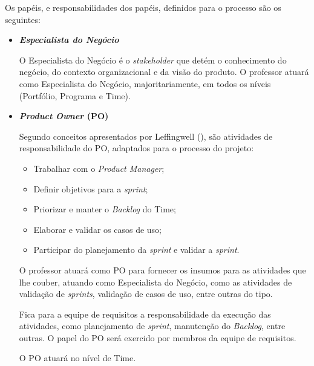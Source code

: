 
  Os papéis, e responsabilidades dos papéis, definidos para o processo são os seguintes:
  
  \begin{itemize}
   
   \item \textbf{\textit{Especialista do Negócio}}
   
      O Especialista do Negócio é o \textit{stakeholder} que detém o conhecimento do negócio, do contexto organizacional
      e da visão do produto.
      O professor atuará como Especialista do Negócio, majoritariamente, em todos os níveis (Portfólio, Programa e Time).
   
   \item \textbf{\textit{Product Owner} (PO)}
      
      Segundo conceitos apresentados por Leffingwell (\citeyear{leffingwell11}),
      são atividades de responsabilidade do PO, adaptados para o processo do projeto:
      
      \begin{itemize}
       
       \item Trabalhar com o \textit{Product Manager};
       
       \item Definir objetivos para a \textit{sprint};
       
       \item Priorizar e manter o \textit{Backlog} do Time;
       
       \item Elaborar e validar os casos de uso;
       
       \item Participar do planejamento da \textit{sprint} e validar a \textit{sprint}.
       
      \end{itemize}

      
      O professor atuará como PO para fornecer os insumos para as atividades que lhe couber, atuando como Especialista
      do Negócio, como as atividades de validação de \textit{sprints}, validação de casos de uso, entre outras do tipo.
      
      Fica para a equipe de requisitos a responsabilidade da execução das atividades, como planejamento de \textit{sprint},
      manutenção do \textit{Backlog}, entre outras. O papel do PO será exercido por membros da equipe de requisitos.
      
      O PO atuará no nível de Time.
      

\end{itemize}
